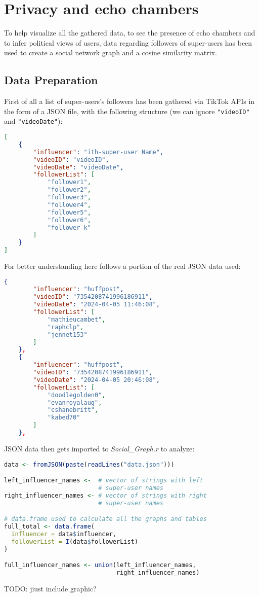 \section{Privacy and echo chambers}
To help visualize all the gathered data, to see the presence of echo chambers and to infer political views of users, data regarding followers of super-users has been used to create a social network graph and a cosine similarity matrix.

\subsection{Data Preparation}
First of all a list of super-users's followers has been gathered via TikTok APIs in the form of a JSON file, with the following structure (we can ignore \verb+"videoID"+ and \verb+"videoDate"+):

\begin{lstlisting}[language=json]
[
    {
        "influencer": "ith-super-user Name",
        "videoID": "videoID",
        "videoDate": "videoDate",
        "followerList": [
            "follower1",
            "follower2",
            "follower3",
            "follower4",
            "follower5",
            "follower6",
            "follower-k"
        ]
    }
]
\end{lstlisting}

For better understanding here follows a portion of the real JSON data used:

\begin{lstlisting}[language=json]
    {
        "influencer": "huffpost",
        "videoID": "7354208741996186911",
        "videoDate": "2024-04-05 11:46:08",
        "followerList": [
            "mathieucambet",
            "raphclp",
            "jennet153"
        ]
    },
    {
        "influencer": "huffpost",
        "videoID": "7354208741996186911",
        "videoDate": "2024-04-05 20:46:08",
        "followerList": [
            "doodlegolden0",
            "evanroyalaug",
            "cshanebritt",
            "kabed70"
        ]
    },
\end{lstlisting}

JSON data then gets imported to \textit{Social\_Graph.r} to analyze:

\begin{lstlisting}[language=R]
data <- fromJSON(paste(readLines("data.json")))

left_influencer_names <-  # vector of strings with left 
                          # super-user names
right_influencer_names <- # vector of strings with right 
                          # super-user names

# data.frame used to calculate all the graphs and tables
full_total <- data.frame(
  influencer = data$influencer,
  followerList = I(data$followerList)
)

full_influencer_names <- union(left_influencer_names, 
                               right_influencer_names)
\end{lstlisting}

TODO: jiust include graphic?